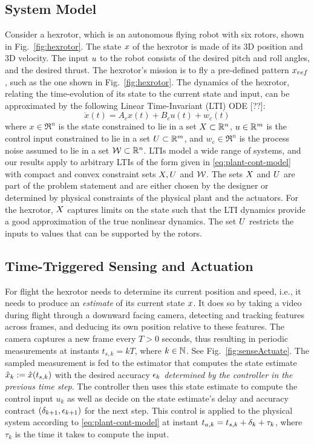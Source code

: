 \subsection{System Model}
\label{formulation}

Consider a hexrotor, which is an autonomous flying robot with six rotors, shown in Fig.~\ref{fig:hexrotor}.
The state $x$ of the hexrotor is made of its 3D position and 3D velocity.
The input $u$ to the robot consists of the desired pitch and roll angles, and the desired thrust.
The hexrotor's mission is to fly a pre-defined pattern $x_{ref}$, such as the one shown in Fig.~\ref{fig:hexrotor}.
The dynamics of the hexrotor, relating the time-evolution of its state to the current state and input, can be approximated by the following Linear Time-Invariant (LTI) ODE [??]:
\begin{equation}
\dot{x}(t) = A_{c}x(t)+B_{c}u(t)+w_{c}(t)  \label{eq:plant-cont-model}
\end{equation}
where $x\in \Re^{n}$ is the state constrained to lie in a set $X \subset \mathbb{R}^n$,
$u\in\mathbb{R}^{m}$ is the control input constrained to lie in a set $U \subset \mathbb{R}^m$,
and $w_{c}\in\Re^{n}$ is the process noise assumed to lie in a set $\mathcal{W} \subset \mathbb{R}^n$.
LTIs model a wide range of systems, and our results apply to arbitrary LTIs of the form given in \eqref{eq:plant-cont-model} with compact and convex constraint sets $X,U$ and $\mathcal{W}$.
The sets $X$ and $U$ are part of the problem statement and are either chosen by the designer or determined by physical constraints of the physical plant and the actuators.
For the hexrotor, $X$ captures limits on the state such that the LTI dynamics provide a good approximation of the true nonlinear dynamics.
The set $U$ restricts the inputs to values that can be supported by the rotors.

\subsection{Time-Triggered Sensing and Actuation}
For flight the hexrotor needs to determine its current position and speed, i.e., it needs to produce an \emph{estimate} of its current state $x$.
It does so by taking a video during flight through a downward facing camera, detecting and tracking features across frames, and deducing its own position relative to these features.
The camera captures a new frame every $T > 0$ seconds, thus resulting in periodic measurements at instants $t_{s,k}=kT$,
where $k\in\mathbb{N}$.
See Fig.~\ref{fig:senseActuate}.
The sampled measurement is fed to the estimator that computes the state
estimate $\hat{x}_{k}:=\hat{x}(t_{s,k})$ with the desired
accuracy $\epsilon_k$ \emph{determined by the controller in the previous time step}.
The controller then uses this state estimate
to compute the control input $u_{k}$ as well as decide on the
state estimate's delay and accuracy contract $(\delta_{k+1},\epsilon_{k+1})$ for the next step.
This control is applied to the physical system according to \eqref{eq:plant-cont-model} at instant $t_{a,k} = t_{s,k}+\delta_k + \tau_k$, where $\tau_k$ is the time it takes to compute the input.

